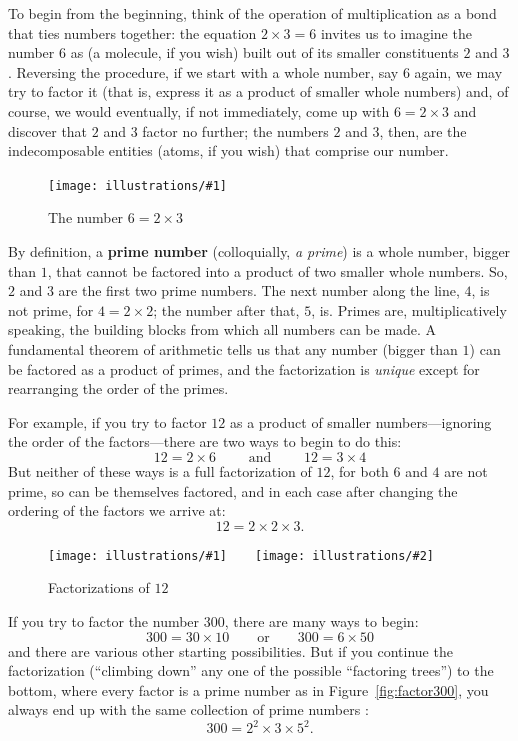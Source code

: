 \documentclass[openany]{book}
\newcommand{\ill}[3]{%
   \begin{figure}[H]%
   \vspace{-2ex}
   \centering%
   \texttt{[image: illustrations/\#1]}%
   \caption{#3}%
   \vspace{-2ex}
    \end{figure}}
\newcommand{\illtwo}[4]{%
   \begin{figure}[H]\centering%
   \texttt{[image: illustrations/\#1]}$\qquad$\texttt{[image: illustrations/\#2]}%
   \caption{#4}%
    \end{figure}}
\theoremstyle{plain}
\theoremstyle{definition}
\begin{document}
 To begin from the beginning, think
of the operation of multiplication as a bond that ties numbers
together: the equation $2\times 3= 6$ invites us to imagine the number
$6$ as (a molecule, if you wish) built out of its smaller constituents
$2$ and $3$.  Reversing the procedure, if we start with a whole
number, say $6$ again, we may try to factor it (that is, express it as
a product of smaller whole numbers) and, of course, we would
eventually, if not immediately, come up with $6 = 2\times 3$ and
discover that $2$ and $3$ factor no further; the numbers $2$ and $3$,
then, are the indecomposable entities (atoms, if you wish) that
comprise our number.

\ill{factor_tree_6}{.3}{The number $6 = 2\times 3$}


By definition, a {\bf prime number}
(colloquially, {\em a prime}) is a whole number, bigger than $1$, that
cannot be factored into a product of two smaller whole numbers. So,
$2$ and $3$ are the first two prime numbers. The next number along the
line, $4$, is not prime, for $4= 2\times 2$; the number after that,
$5$, is. Primes are, multiplicatively speaking, the building blocks
from which all numbers can be made. A fundamental theorem of
arithmetic tells us that any number (bigger than $1$) can be factored
as a product of primes, and the factorization is {\em unique} except
for rearranging the order of the primes.



For example, if you try to factor $12$ as a product of
smaller numbers---ignoring the order of the factors---there are two
ways to begin to do this:
$$
  12 = 2 \times 6 \qquad\text{ and }\qquad   12 = 3 \times 4
$$
But neither of these ways is a full factorization of $12$, for both
$6$ and $4$ are not prime, so can be themselves factored, and in each
case after changing the ordering of the factors we arrive at:
$$
   12= 2 \times 2 \times 3.
$$
\illtwo{factor_tree_12}{factor_tree_12b}{0.3}{Factorizations of $12$}

If you try to factor the number $300$, there are many
ways to begin:
$$
  300= 30\times 10\qquad\text{or}\qquad 300 = 6 \times 50
$$
and there are various other starting possibilities. But if you
continue the factorization (``climbing down'' any one of the possible
``factoring trees'') to the bottom, where every factor is a prime
number as in Figure~\ref{fig:factor300}, you always end up with the
same collection of prime numbers :
                 $$300 = 2^2\times 3\times 5^2.$$
\end{document}
